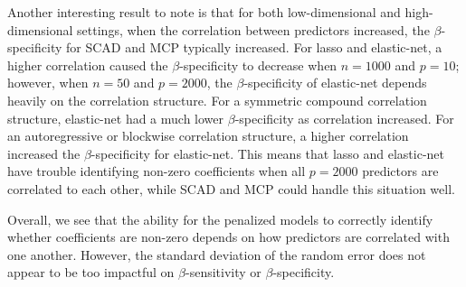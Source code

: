\documentclass{article}
\begin{document}
Another interesting result to note is that for both low-dimensional and high-dimensional settings, when the correlation between predictors increased, the $\beta$-specificity for SCAD and MCP typically increased. For lasso and elastic-net, a higher correlation caused the $\beta$-specificity to decrease when $n = 1000$ and $p = 10$; however, when $n = 50$ and $p = 2000$, the $\beta$-specificity of elastic-net depends heavily on the correlation structure. For a symmetric compound correlation structure, elastic-net had a much lower $\beta$-specificity as correlation increased. For an autoregressive or blockwise correlation structure, a higher correlation increased the $\beta$-specificity for elastic-net. This means that lasso and elastic-net have trouble identifying non-zero coefficients when all $p = 2000$ predictors are correlated to each other, while SCAD and MCP could handle this situation well.

Overall, we see that the ability for the penalized models to correctly identify whether coefficients are non-zero depends on how predictors are correlated with one another. However, the standard deviation of the random error does not appear to be too impactful on $\beta$-sensitivity or $\beta$-specificity.

\end{document}
